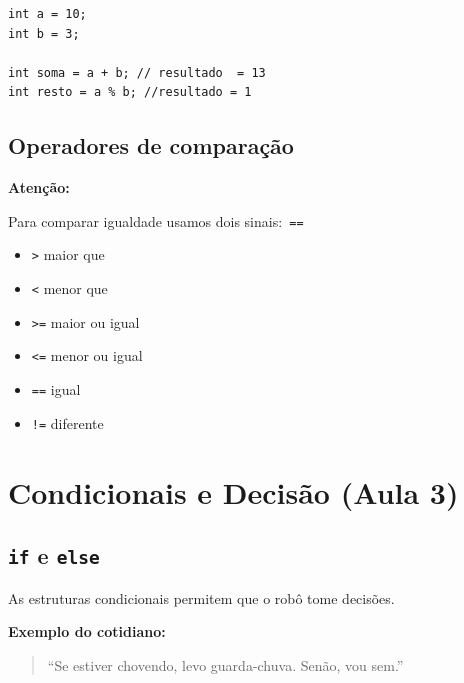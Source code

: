 \documentclass[conference]{IEEEtran}
\begin{document}
\vspace{0.2cm}
 
\begin{lstlisting}[caption={Exemplo de operações}]
int a = 10;
int b = 3;

int soma = a + b; // resultado  = 13
int resto = a % b; //resultado = 1
\end{lstlisting}

\subsection{Operadores de comparação}

\textbf{Atenção:}

Para comparar igualdade usamos dois sinais:\texttt{ ==}

\vspace{0.3cm}

\begin{itemize}
    \item \texttt{>} maior que
    \item \texttt{<} menor que
    \item \texttt{>=} maior ou igual
    \item \texttt{<=} menor ou igual
    \item \texttt{==} igual
    \item \texttt{!=} diferente
\end{itemize}

\vspace{0.3cm}

\section{Condicionais e Decisão (Aula 3)}

\subsection{\texttt{if} e \texttt{else}}

As estruturas condicionais permitem que o robô tome decisões.

\vspace{0.2cm}

\textbf{Exemplo do cotidiano:}

\begin{quote}
“Se estiver chovendo, levo guarda-chuva. Senão, vou sem.”
\end{quote}
\end{document}
